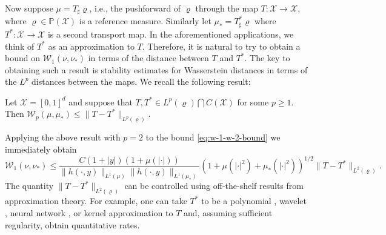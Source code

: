 \documentclass[final]{siamart171218}
\newcommand{\mcl}{\mathcal}
\newcommand{\mbb}{\mathbb}
\newcommand{\mX}{\mcl{X}}
\newcommand{\PP}{\mbb{P}}
\newcommand{\W}{\mathcal{W}}
\begin{document}
Now suppose $\mu = T_\sharp \varrho$, i.e., the pushforward of $\varrho$ 
through the map $T: \mX \to \mX$, 
where $\varrho \in \PP(\mX)$ is a reference measure. 
Similarly let $\mu_\ast = T_\sharp^\ast \varrho$ where $T^\ast:\mX \to \mX$ is a second
transport map. In the aforementioned applications, we think of  $T^\ast$
as an approximation to $T$. Therefore, it is natural to try to obtain 
a bound on $\W_1(\nu, \nu_\ast)$ in terms of the distance between $T$ and $T^\ast$.
The key to obtaining such a result is stability estimates for Wasserstein distances in terms 
 of the $L^p$ distances between the maps. We recall the following result:


\begin{proposition}
\label{thm:sagiv}
Let $\mX = [0,1]^d$  and suppose that $T, T^\ast \in L^p(\varrho) \bigcap C(\mX)$ 
for some $p\geq 1$. Then  
$\W_p(\mu, \mu_\ast) \leq \|T - T^\ast\|_{L^p(\varrho)}.$
\end{proposition}

Applying the above result with $p=2$ to the bound \eqref{eq:w-1-w-2-bound} we immediately obtain 
\begin{equation*}
    \W_1(\nu, \nu_\ast) 
    \le \frac{C(1+|y|)(1 + \mu( |\cdot |))}{\|h(\cdot,y)\|_{L^1(\mu)} \|h(\cdot,y)\|_{L^1(\mu_\ast)}} 
    \left( 1 +  \mu( | \cdot |^2) + \mu_\ast( | \cdot |^2) \right)^{1/2}
    \|T - T^\ast\|_{L^2(\varrho)}.
  \end{equation*}
The quantity $\|T - T^\ast\|_{L^2(\varrho)}$ can be controlled using off-the-shelf 
results from approximation theory. For example, one can take $T^\ast$ to be a polynomial \cite{devore1993constructive}, 
 wavelet \cite{meyer1992wavelets}, neural network \cite{devore2021neural}, or kernel approximation \cite{wendland2004scattered}
 to $T$ and, assuming  sufficient regularity, obtain quantitative rates.


  
\end{document}
